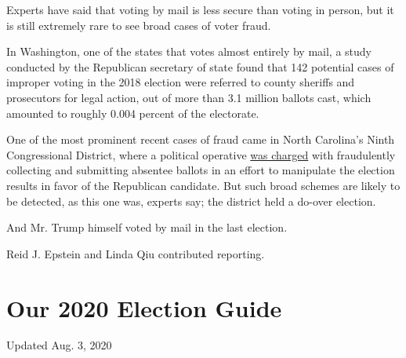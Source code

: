 Experts have said that voting by mail is less secure than voting in
person, but it is still extremely rare to see broad cases of voter
fraud.

In Washington, one of the states that votes almost entirely by mail, a
study conducted by the Republican secretary of state found that 142
potential cases of improper voting in the 2018 election were referred to
county sheriffs and prosecutors for legal action, out of more than 3.1
million ballots cast, which amounted to roughly 0.004 percent of the
electorate.

One of the most prominent recent cases of fraud came in North Carolina's
Ninth Congressional District, where a political operative
\href{https://www.nytimes.com/2019/07/30/us/mccrae-dowless-indictment.html}{was
charged} with fraudulently collecting and submitting absentee ballots in
an effort to manipulate the election results in favor of the Republican
candidate. But such broad schemes are likely to be detected, as this one
was, experts say; the district held a do-over election.

And Mr. Trump himself voted by mail in the last election.

Reid J. Epstein and Linda Qiu contributed reporting.

\hypertarget{our-2020-election-guide}{%
\section{Our 2020 Election Guide}\label{our-2020-election-guide}}

Updated Aug. 3, 2020

